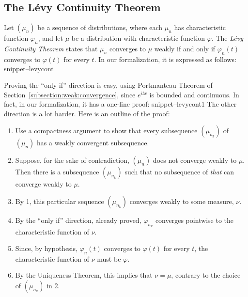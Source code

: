 \documentclass{svjour3}
\newcommand{\ph}{\varphi}
\newcommand{\Snippet}[1]{\csname snippet--#1\endcsname}
\begin{document}
\subsection{The L\'evy Continuity Theorem}

Let $(\mu_n)$ be a sequence of distributions, where each $\mu_n$ has characteristic function $\ph_n$, and let $\mu$ be a distribution with characteristic function $\ph$. The \emph{L\'evy Continuity Theorem} states that $\mu_n$ converges to $\mu$ weakly if and only if $\ph_n(t)$ converges to $\ph(t)$ for every $t$. In our formalization, it is expressed as follows:
\Snippet{levycont }

Proving the ``only if'' direction is easy, using Portmanteau Theorem of Section~\ref{subsection:weak:convergence}, since $e^{itx}$ is bounded and continuous. In fact, in our formalization, it has a one-line proof:
\Snippet{levycont1}
The other direction is a lot harder. Here is an outline of the proof:
\begin{enumerate}
 \item Use a compactness argument to show that every subsequence $(\mu_{n_k})$ of $(\mu_n)$ has a weakly convergent subsequence.
 \item Suppose, for the sake of contradiction, $(\mu_n)$ does not converge weakly to $\mu$. Then there is a subsequence $(\mu_{n_k})$ such that no subsequence of \emph{that} can converge weakly to $\mu$.
 \item By 1, this particular sequence $(\mu_{n_k})$ converges weakly to some measure, $\nu$. 
 \item By the ``only if'' direction, already proved, $\ph_{n_k}$ converges pointwise to the characteristic function of $\nu$.
 \item Since, by hypothesis, $\ph_n(t)$ converges to $\ph(t)$ for every $t$, the characteristic function of $\nu$ must be $\ph$.
 \item By the Uniqueness Theorem, this implies that $\nu = \mu$, contrary to the choice of $(\mu_{n_k})$ in 2.
\end{enumerate}
\end{document}
